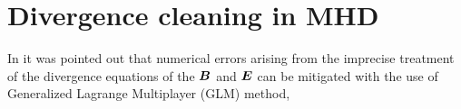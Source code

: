\documentclass{article}
\begin{document}
\section{Divergence cleaning in MHD}
In \cite{Munz:2000xu,Dedner:2001jc,Komissarov:2007wk,Takamoto:2011ng} it was pointed out that numerical errors arising from the imprecise treatment of the divergence equations of the $\BB$ and $\EE$ can be mitigated with the use of Generalized Lagrange Multiplayer (GLM) method,



\end{document}
